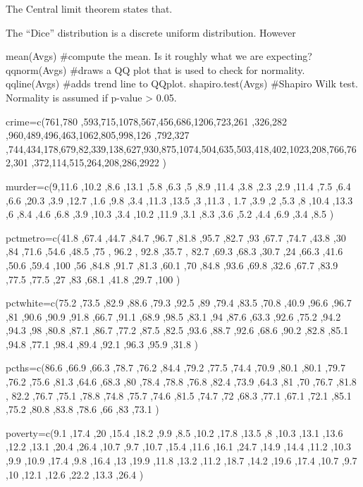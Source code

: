 \documentclass[a4paper,12pt]{article}
\begin{document}
The Central limit theorem states that.

The “Dice” distribution is a discrete uniform distribution. However

mean(Avgs)           	          	             #compute the mean. Is it roughly what we are expecting?
qqnorm(Avgs)           	          	             #draws a QQ plot that is used to check for normality.
qqline(Avgs)           	          	             #adds trend line to QQplot.
shapiro.test(Avgs)           	             #Shapiro Wilk test. Normality is assumed if p-value > 0.05.
	                                     


crime=c(761,780 ,593,715,1078,567,456,686,1206,723,261 ,326,282 ,960,489,496,463,1062,805,998,126 ,792,327 ,744,434,178,679,82,339,138,627,930,875,1074,504,635,503,418,402,1023,208,766,762,301 ,372,114,515,264,208,286,2922 )

murder=c(9,11.6 ,10.2 ,8.6 ,13.1 ,5.8 ,6.3 ,5 ,8.9 ,11.4 ,3.8 ,2.3 ,2.9 ,11.4 ,7.5 ,6.4 ,6.6 ,20.3 ,3.9 ,12.7 ,1.6 ,9.8 ,3.4 ,11.3 ,13.5 ,3 ,11.3 ,
1.7 ,3.9 ,2 ,5.3 ,8 ,10.4 ,13.3 ,6 ,8.4 ,4.6 ,6.8 ,3.9 ,10.3 ,3.4 ,10.2 ,11.9 ,3.1 ,8.3 ,3.6 ,5.2 ,4.4 ,6.9 ,3.4 ,8.5 )

pctmetro=c(41.8 ,67.4 ,44.7 ,84.7 ,96.7 ,81.8 ,95.7 ,82.7 ,93 ,67.7 ,74.7 ,43.8 ,30 ,84 ,71.6 ,54.6 ,48.5 ,75 , 96.2 , 92.8 ,35.7 ,
82.7 ,69.3 ,68.3 ,30.7 ,24 ,66.3 ,41.6 ,50.6 ,59.4 ,100 ,56 ,84.8 ,91.7 ,81.3 ,60.1 ,70 ,84.8 ,93.6 ,69.8 ,32.6 ,67.7 ,83.9 ,77.5 ,77.5 ,27 ,83 ,68.1 ,41.8 ,29.7 ,100 )

pctwhite=c(75.2 ,73.5 ,82.9 ,88.6 ,79.3 ,92.5 ,89 ,79.4 ,83.5 ,70.8 ,40.9 ,96.6 ,96.7 ,81 ,90.6 ,90.9 ,91.8 ,66.7 ,91.1 ,68.9 ,98.5 ,83.1 ,94 ,87.6 ,63.3 ,92.6 ,75.2 ,94.2 ,94.3 ,98 ,80.8 ,87.1 ,86.7 ,77.2 ,87.5 ,82.5 ,93.6 ,88.7 ,92.6 ,68.6 ,90.2 ,82.8 ,85.1 ,94.8 ,77.1 ,98.4 ,89.4 ,92.1 ,96.3 ,95.9 ,31.8 )

pcths=c(86.6 ,66.9 ,66.3 ,78.7 ,76.2 ,84.4 ,79.2 ,77.5 ,74.4 ,70.9 ,80.1 ,80.1 ,79.7 ,76.2 ,75.6 ,81.3 ,64.6 ,68.3 ,80 ,78.4 ,78.8 ,76.8 ,82.4 ,73.9 ,64.3 ,81 ,70 ,76.7 ,81.8 , 82.2 ,76.7 ,75.1 ,78.8 ,74.8 ,75.7 ,74.6 ,81.5 ,74.7 ,72 ,68.3 ,77.1 ,67.1 ,72.1 ,85.1 ,75.2 ,80.8 ,83.8 ,78.6 ,66 ,83 ,73.1 )

poverty=c(9.1 ,17.4 ,20 ,15.4 ,18.2 ,9.9 ,8.5 ,10.2 ,17.8 ,13.5 ,8 ,10.3 ,13.1 ,13.6 ,12.2 ,13.1 ,20.4 ,26.4 ,10.7 ,9.7 ,10.7 ,15.4 ,11.6 ,16.1 ,24.7 ,14.9 ,14.4 ,11.2 ,10.3 ,9.9 ,10.9 ,17.4 ,9.8 ,16.4 ,13 ,19.9 ,11.8 ,13.2 ,11.2 ,18.7 ,14.2 ,19.6 ,17.4 ,10.7 ,9.7 ,10 ,12.1 ,12.6 ,22.2 ,13.3 ,26.4 )
\end{document}

